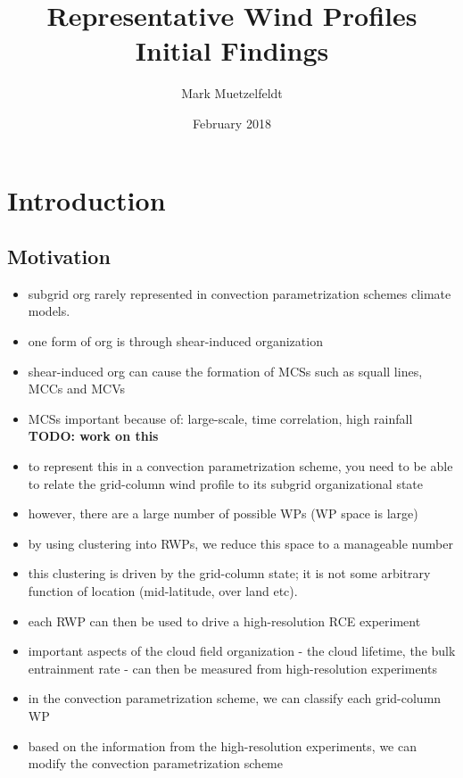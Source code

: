 \documentclass{article}
\title{Representative Wind Profiles Initial Findings}
\author{Mark Muetzelfeldt}
\date{February 2018}
\newcommand\todo[1]{\textbf{TODO: #1}}
\begin{document}
\maketitle

\section{Introduction}



\subsection{Motivation}



\begin{itemize}
    \item subgrid org rarely represented in convection parametrization schemes climate models.
    \item one form of org is through shear-induced organization
    \item shear-induced org can cause the formation of MCSs such as squall lines, MCCs and MCVs \cite{houze2004mesoscale}
    \item MCSs important because of: large-scale, time correlation, high rainfall \todo{work on this}
    \item to represent this in a convection parametrization scheme, you need to be able to relate the grid-column wind profile to its subgrid organizational state
    \item however, there are a large number of possible WPs (WP space is large)
    \item by using clustering into RWPs, we reduce this space to a manageable number
    \item this clustering is driven by the grid-column state; it is not some arbitrary function of location (mid-latitude, over land etc).
    \item each RWP can then be used to drive a high-resolution RCE experiment
    \item important aspects of the cloud field organization - the cloud lifetime, the bulk entrainment rate - can then be measured from high-resolution experiments
    \item in the convection parametrization scheme, we can classify each grid-column WP
    \item based on the information from the high-resolution experiments, we can modify the convection parametrization scheme
\end{itemize}
\end{document}
